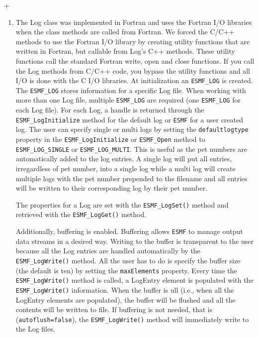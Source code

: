 +%
%
\begin{enumerate}
\item The Log class was implemented in Fortran and uses the Fortran I/O 
libraries when the class methods are called from Fortran. We forced the C/C++
methods to use the Fortran I/O library by creating utility functions that are
written in Fortran, but callable from Log's C++ methods.  These utility 
functions call the standard Fortran write, open and close functions.  If you
call the Log methods from C/C++ code, you bypass the utility functions and 
all I/O is done with the C I/O libraries.
At initialization an {\tt ESMF\_LOG} is created.  The {\tt ESMF\_LOG} stores 
information for a specific Log file.   When working with more than one 
Log file, multiple {\tt ESMF\_LOG} are required (one {\tt ESMF\_LOG} for each 
Log file).  For each Log, a handle is returned through the 
{\tt ESMF\_LogInitialize} method for the default log or {\tt ESMF\LogOpen} for a
user created log.  The user can specify single or multi logs by setting the
{\tt defaultlogtype} property in the {\tt ESMF\_LogInitialize} or 
{\tt ESMF\_Open} method to {\tt ESMF\_LOG\_SINGLE} or {\tt ESMF\_LOG\_MULTI}.
This is useful as the pet numbers are automatically added to the log entries.
A single log will put all entries, irregardless of pet number, into a single
log while a multi log will create multiple logs with the pet number prepended
to the filename and all entries will be written to their corresponding log 
by their pet number.

The properties for a Log are set with the {\tt ESMF\_LogSet()} method and 
retrieved with the {\tt ESMF\_LogGet()} method.

Additionally, buffering is enabled.  Buffering allows {\tt ESMF} to manage 
output data streams in a desired way.  Writing to the buffer is transparent 
to the user because all the Log entries are handled automatically by the 
{\tt ESMF\_LogWrite()} method.  All the user has to do is specify the buffer
size (the default is ten) by setting the {\tt maxElements} property.  Every 
time the {\tt ESMF\_LogWrite()} method is called, a LogEntry element is 
populated with the {\tt ESMF\_LogWrite()} information.  When the buffer is 
ull (i.e., when all the LogEntry elements are populated), the buffer will be 
flushed and all the contents will be written to file.  If buffering is not 
needed, that is ({\tt autoflush=false}), the {\tt ESMF\_LogWrite()} method 
will immediately write to the Log files. 


\end{enumerate}




